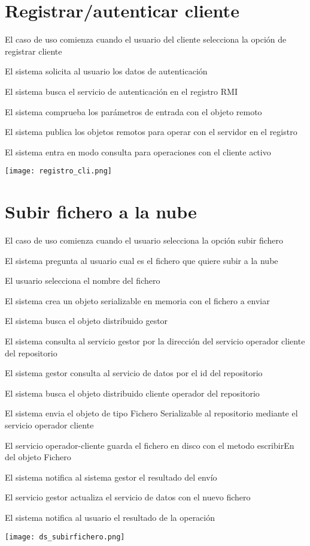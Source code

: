 \section{Registrar/autenticar cliente}

\begin{compactenum}
	\item El caso de uso comienza cuando el usuario del cliente selecciona la opción de registrar cliente
	\item El sistema solicita al usuario los datos de autenticación
	\item El sistema busca el servicio de autenticación en el registro RMI
	\item El sistema comprueba los parámetros de entrada con el objeto remoto
	\item El sistema publica los objetos remotos para operar con el servidor en el registro
	\item El sistema entra en modo consulta para operaciones con el cliente activo
\end{compactenum}
\texttt{[image: registro\_cli.png]}

\section{Subir fichero a la nube}
\begin{compactenum}
	\item El caso de uso comienza cuando el usuario selecciona la opción subir fichero
	\item El sistema pregunta al usuario cual es el fichero que quiere subir a la nube
	\item El usuario selecciona el nombre del fichero
	\item El sistema crea un objeto serializable en memoria con el fichero a enviar
	\item El sistema busca el objeto distribuido gestor
	\item El sistema consulta al servicio gestor por la dirección del servicio operador cliente del repositorio
	\item El sistema gestor consulta al servicio de datos por el id del repositorio
	\item El sistema busca el objeto distribuido cliente operador del repositorio
	\item El sistema envia el objeto de tipo Fichero Serializable al repositorio mediante el servicio operador cliente
	\item El servicio operador-cliente guarda el fichero en disco con el metodo escribirEn del objeto Fichero
	\item El sistema notifica al sistema gestor el resultado del envío
	\item El servicio gestor actualiza el servicio de datos con el nuevo fichero
	\item El sistema notifica al usuario el resultado de la operación
\end{compactenum}
\texttt{[image: ds\_subirfichero.png]}


